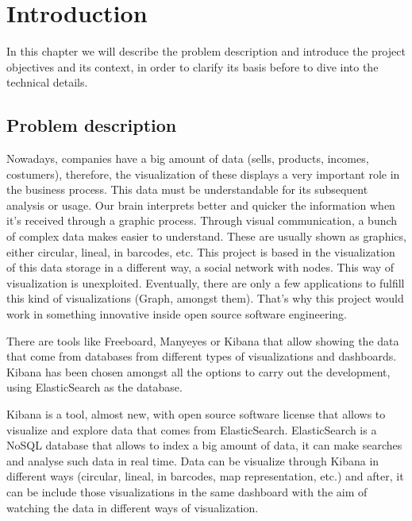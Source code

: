 \documentclass[a4paper, 12pt]{book}
\begin{document}
\cleardoublepage
\chapter{Introduction}
\label{sec:intro} %

In this chapter we will describe the problem description and introduce the project objectives and its context, in order to clarify its basis before to dive into the technical details.

\section{Problem description}
\label{sec:probdescr}

Nowadays, companies have a big amount of data (sells, products, incomes, costumers), therefore, the visualization of these displays a very important role in the business process. This data must be understandable for its subsequent analysis or usage. Our brain interprets better and quicker the information when it's received through a graphic process. Through visual communication, a bunch of complex data makes easier to understand. These are usually shown as graphics, either circular, lineal, in barcodes, etc. This project is based in the visualization of this data storage in a different way, a social network with nodes. This way of visualization is unexploited. Eventually, there are only a few applications to fulfill this kind of visualizations (Graph, amongst them). That's why this project would work in something innovative inside open source software engineering.

There are tools like Freeboard, Manyeyes or Kibana that allow showing the data that come from databases from different types of visualizations and dashboards. Kibana has been chosen amongst all the options to carry out the development, using ElasticSearch as the database.

Kibana is a tool, almost new, with open source software license that allows to visualize and explore data that comes from ElasticSearch. ElasticSearch is a NoSQL database that allows to index a big amount of data, it can make searches and analyse such data in real time. Data can be visualize through Kibana in different ways (circular, lineal, in barcodes, map representation, etc.) and after, it can be include those visualizations in the same dashboard with the aim of watching the data in different ways of visualization.
\end{document}
